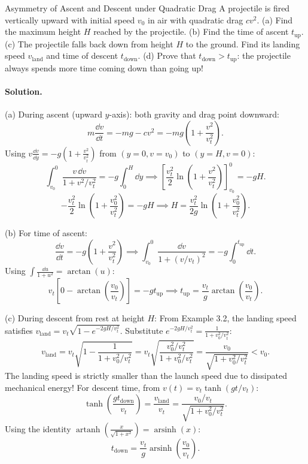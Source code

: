 \begin{workedexample}{Asymmetry of Ascent and Descent under Quadratic Drag}
A projectile is fired vertically upward with initial speed $v_0$ in air with quadratic drag $c v^2$.
(a) Find the maximum height $H$ reached by the projectile.
(b) Find the time of ascent $t_{\text{up}}$.
(c) The projectile falls back down from height $H$ to the ground. Find its landing speed $v_{\text{land}}$ and time of descent $t_{\text{down}}$.
(d) Prove that $t_{\text{down}} > t_{\text{up}}$: the projectile always spends more time coming down than going up!

\paragraph{Solution.}

(a) During ascent (upward $y$-axis): both gravity and drag point downward:
\[
m\frac{\dd v}{\dd t} = -mg - cv^2 = -mg\left(1 + \frac{v^2}{v_t^2}\right).
\]
Using $v\frac{\dd v}{\dd y} = -g\left(1 + \frac{v^2}{v_t^2}\right)$ from $(y=0, v=v_0)$ to $(y=H, v=0)$:
\[
\int_{v_0}^0 \frac{v\,\dd v}{1 + v^2/v_t^2} = -g\int_0^H \dd y \implies \left[ \frac{v_t^2}{2}\ln\left(1 + \frac{v^2}{v_t^2}\right) \right]_{v_0}^0 = -gH.
\]
\[
-\frac{v_t^2}{2}\ln\left(1 + \frac{v_0^2}{v_t^2}\right) = -gH \implies \boxed{H = \frac{v_t^2}{2g}\ln\left(1 + \frac{v_0^2}{v_t^2}\right).}
\]

(b) For time of ascent:
\[
\frac{\dd v}{\dd t} = -g\left(1 + \frac{v^2}{v_t^2}\right) \implies \int_{v_0}^0 \frac{\dd v}{1 + (v/v_t)^2} = -g\int_0^{t_{\text{up}}}\dd t.
\]
Using $\int \frac{\dd u}{1 + u^2} = \arctan(u)$:
\[
v_t\left[ 0 - \arctan\left(\frac{v_0}{v_t}\right) \right] = -gt_{\text{up}} \implies \boxed{t_{\text{up}} = \frac{v_t}{g}\arctan\left(\frac{v_0}{v_t}\right).}
\]

(c) During descent from rest at height $H$:
From Example 3.2, the landing speed satisfies $v_{\text{land}} = v_t\sqrt{1 - e^{-2gH/v_t^2}}$.
Substitute $e^{-2gH/v_t^2} = \frac{1}{1 + v_0^2/v_t^2}$:
\[
v_{\text{land}} = v_t\sqrt{1 - \frac{1}{1 + v_0^2/v_t^2}} = v_t\sqrt{\frac{v_0^2/v_t^2}{1 + v_0^2/v_t^2}} = \boxed{\frac{v_0}{\sqrt{1 + v_0^2/v_t^2}} < v_0.}
\]
The landing speed is strictly smaller than the launch speed due to dissipated mechanical energy!
For descent time, from $v(t) = v_t\tanh(gt/v_t)$:
\[
\tanh\left(\frac{gt_{\text{down}}}{v_t}\right) = \frac{v_{\text{land}}}{v_t} = \frac{v_0/v_t}{\sqrt{1 + v_0^2/v_t^2}}.
\]
Using the identity $\operatorname{artanh}\left(\frac{x}{\sqrt{1+x^2}}\right) = \operatorname{arsinh}(x)$:
\[
\boxed{t_{\text{down}} = \frac{v_t}{g}\operatorname{arsinh}\left(\frac{v_0}{v_t}\right).}
\]


\end{workedexample}
